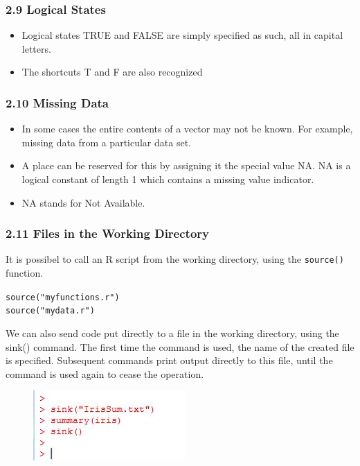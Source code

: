 \documentclass{beamer}
\begin{document}
 	\begin{frame} 
 		\frametitle{2.9 Logical States}
 		\begin{itemize}
 			\item Logical states TRUE and FALSE are simply specified as such, all in capital letters. 
 			\item The
 			shortcuts T and F are also recognized
 		\end{itemize}
 	\end{frame}
 	\begin{frame}
 		\frametitle{2.10 Missing Data}
 		\begin{itemize}
 			\item In some cases the entire contents of a vector may not be known. For example, missing data
 			from a particular data set. \item A place can be reserved for this by assigning it the special value
 			NA.
 			NA is a logical constant of length 1 which contains a missing value indicator.
 			\item  NA stands
 			for Not Available.
 		\end{itemize}
 	\end{frame}
 	\begin{frame}
 		
 		\frametitle{2.11 Files in the Working Directory}
 		It is possibel to call an R script from the working directory, using the \texttt{source()} function.
 		\begin{framed}
 			
 			\texttt{source("myfunctions.r")\\
 				source("mydata.r")}
 			
 		\end{framed} 
 		We can also send code put directly to a file in the working directory, using the sink()
 		command. The first time the command is used, the name of the created file is specified.
 		Subsequent commands print output directly to this file, until the command is used again to
 		cease the operation.
 	\end{frame}
 	\begin{frame}
 		\begin{figure}
 			\centering
 			\includegraphics[width=0.7\linewidth]{images/sinkiris}
 			\caption{}
 			\label{fig:sinkiris}
 		\end{figure}
 		
 	\end{frame}
 	
\end{document}
